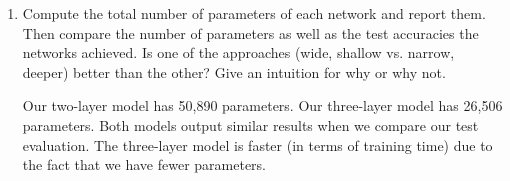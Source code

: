 \documentclass{article}
\begin{document}
\begin{aprob}
\begin{enumerate}
        \item {}
        Compute the total number of parameters of each network and report them.
        Then compare the number of parameters as well as the test accuracies the networks achieved. Is one of the approaches (wide, shallow vs. narrow, deeper) better than the other? Give
        an intuition for why or why not.
        
        Our two-layer model has 50,890 parameters. Our three-layer model has 26,506 parameters. Both models output similar results when we compare our test evaluation. The three-layer model is faster (in terms of training time) due to the fact that we have fewer parameters. 
        
    \end{enumerate}

\end{aprob}
\end{document}
